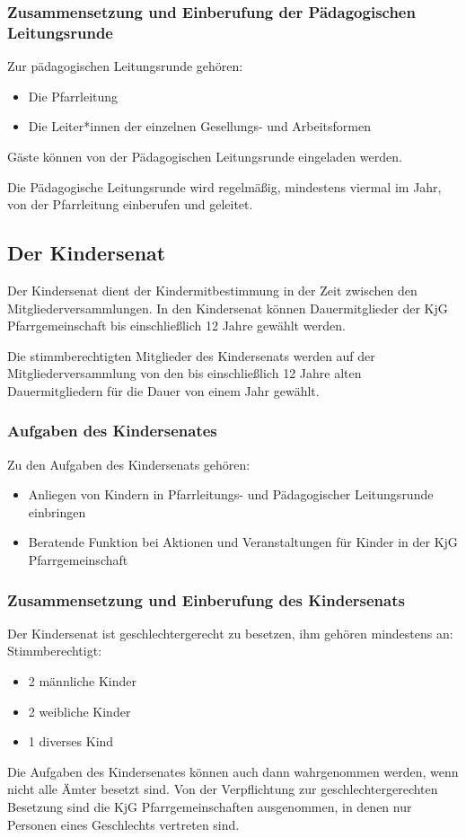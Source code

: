 \documentclass[12pt]{report}
\newcommand{\footnoterecall}[1]{%
  \footnotemark[\value{#1}]
}
\begin{document}
\begin{flushleft}
\subsubsection{Zusammensetzung und Einberufung der Pädagogischen Leitungsrunde}
Zur pädagogischen Leitungsrunde gehören:
\begin{itemize}
  \item Die Pfarrleitung
  \item Die Leiter*innen der einzelnen Gesellungs- und Arbeitsformen
\end{itemize}

Gäste können von der Pädagogischen Leitungsrunde eingeladen werden.

Die Pädagogische Leitungsrunde wird regelmäßig, mindestens viermal im Jahr,
von der Pfarrleitung einberufen und geleitet.

\subsection{Der Kindersenat}
Der Kindersenat dient der Kindermitbestimmung in der Zeit zwischen den Mitgliederversammlungen.
In den Kindersenat können Dauermitglieder der KjG Pfarrgemeinschaft bis einschließlich 12
Jahre gewählt werden.

Die stimmberechtigten Mitglieder des Kindersenats werden auf der Mitgliederversammlung von
den bis einschließlich 12 Jahre alten Dauermitgliedern für die Dauer von einem Jahr gewählt.

\subsubsection{Aufgaben des Kindersenates}
Zu den Aufgaben des Kindersenats gehören:
\begin{itemize}
  \item Anliegen von Kindern in Pfarrleitungs- und Pädagogischer Leitungsrunde einbringen
  \item Beratende Funktion bei Aktionen und Veranstaltungen für Kinder in der KjG Pfarrgemeinschaft
\end{itemize}

\subsubsection{Zusammensetzung und Einberufung des Kindersenats}

Der Kindersenat ist geschlechtergerecht zu besetzen, ihm gehören mindestens an:
Stimmberechtigt:
\begin{itemize}
  \item 2 männliche Kinder
  \item 2 weibliche Kinder
  \item 1 diverses Kind
\end{itemize}
Die Aufgaben des Kindersenates können auch dann wahrgenommen werden, wenn nicht alle Ämter besetzt sind.
Von der Verpflichtung zur geschlechtergerechten\footnoterecall{geschlechtergerecht} Besetzung sind die KjG Pfarrgemeinschaften ausgenommen,
in denen nur Personen eines Geschlechts vertreten sind.


\end{flushleft}
\end{document}
